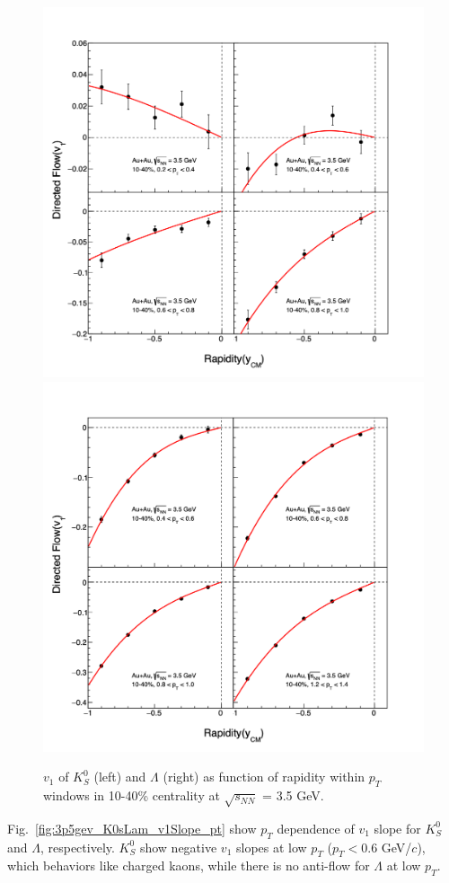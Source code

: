 \begin{figure}[hbt!]
\centering
\includegraphics[width=0.45\linewidth]{figures/chapter03/3p5gev_K0s_v1VSy_pT_cent1.png}
\includegraphics[width=0.45\linewidth]{figures/chapter03/3p5gev_Lambda_v1VSy_pT_cent1.png}
\caption{$v_1$ of $K^0_S$ (left) and $\Lambda$ (right) as function of rapidity within $p_T$ windows in 10-40\% centrality at $\sqrt{s_{NN}}$ = 3.5 GeV.}
\label{fig:3p5gev_K0sLam_v1y_pt_cent1}
\end{figure}

Fig.~\ref{fig:3p5gev_K0sLam_v1Slope_pt} show $p_T$ dependence of $v_1$ slope for $K^0_S$ and $\Lambda$, respectively.
$K^0_S$ show negative $v_1$ slopes at low $p_T$ ($p_T < 0.6$ GeV/$c$), which behaviors like charged kaons, 
while there is no anti-flow for $\Lambda$ at low $p_T$.

